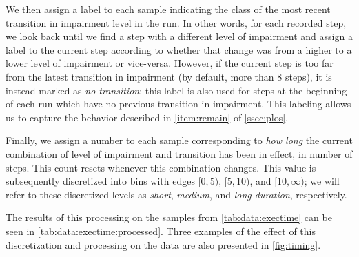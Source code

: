 We then assign a label to each sample indicating the class of the most recent transition in impairment level in the run.
In other words, for each recorded step, we look back until we find a step with a different level of impairment and assign a label to the current step according to whether that change was from a higher to a lower level of impairment or vice-versa.
However, if the current step is too far from the latest transition in impairment (by default, more than \num{8} steps), it is instead marked as \emph{no transition}; this label is also used for steps at the beginning of each run which have no previous transition in impairment.
This labeling allows us to capture the behavior described in \cref{item:remain} of \cref{ssec:plos}.

Finally, we assign a number to each sample corresponding to \emph{how long} the current combination of level of impairment and transition has been in effect, in number of steps.
This count resets whenever this combination changes.
This value is subsequently discretized into bins with edges \( [0, 5) \), \( [5, 10) \), and \( [10, \infty) \); we will refer to these discretized levels as \emph{short}, \emph{medium}, and \emph{long duration}, respectively.

The results of this processing on the samples from \cref{tab:data:exectime} can be seen in \cref{tab:data:exectime:processed}.
Three examples of the effect of this discretization and processing on the data are also presented in \cref{fig:timing}.

